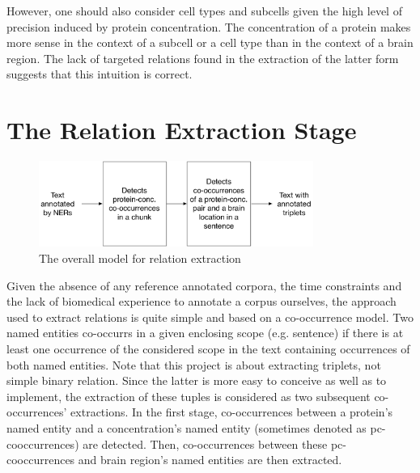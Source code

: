 \documentclass{report}
\begin{document}
                However, one should also consider cell types and subcells given
                the high level of precision induced by protein concentration. 
                The concentration of a protein makes more sense in the context of 
                a subcell or a cell type than in the context of a brain region. 
                The lack of targeted relations found in the extraction of the 
                latter form suggests that this intuition is correct.
                
		\section{The Relation Extraction Stage}
		\begin{figure}[hb]
		    \centering
		    \includegraphics[width=0.8\textwidth]{fig/RE_diagram.pdf}
		    \caption{The overall model for relation extraction}
		    \label{fig:RE_model}
		\end{figure}
		Given the absence of any reference annotated corpora, the time 
		constraints and the lack of biomedical experience to annotate a corpus 
		ourselves, the approach used to extract relations is quite simple and 
		based on a co-occurrence model. Two named entities 
		co-occurrs in a given enclosing scope (e.g. sentence) if there is at 
		least one occurrence of the considered scope 
		in the text containing occurrences of both named entities.  Note that this project is about extracting triplets, 
		not simple binary relation. Since the latter is more easy to conceive as well as to implement, the extraction of 
		these tuples is considered as two subsequent co-occurrences' extractions. In the first stage, co-occurrences between 
		a protein's named entity and a concentration's named entity (sometimes denoted as pc-cooccurrences) are detected. 
		Then, co-occurrences between these pc-cooccurrences and brain region's named entities are then extracted.
		
\end{document}
